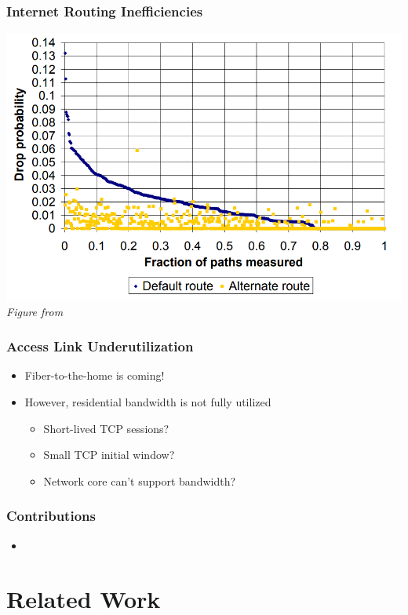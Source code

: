\documentclass{beamer}
\begin{document}
\begin{frame}
  \frametitle{Internet Routing Inefficiencies}

  \includegraphics[height=0.85\textheight]{figures/detour-packetloss.png} \\
  \textit{Figure from \cite{detour}}
\end{frame}

\begin{frame}
  \frametitle{Access Link Underutilization}

  \begin{itemize}
  \item Fiber-to-the-home is coming!
  \item However, residential bandwidth is not fully utilized
    \cite{fibertothehome}
    \begin{itemize}
    \item Short-lived TCP sessions?
    \item Small TCP initial window?
    \item Network core can't support bandwidth?
    \end{itemize}
  \end{itemize}
\end{frame}

\begin{frame}
  \frametitle{Contributions}

  \begin{itemize}
  \item
  \end{itemize}
\end{frame}

\section{Related Work}
\end{document}
